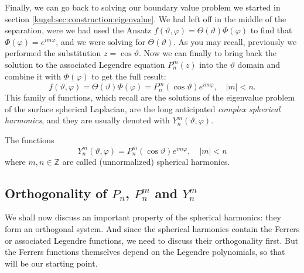 Finally, we can go back to solving our boundary value problem we started in
section \ref{kugel:sec:construction:eigenvalue}. We had left off in the middle
of the separation, were we had used the Ansatz $f(\vartheta, \varphi) =
\Theta(\vartheta) \Phi(\varphi)$ to find that $\Phi(\varphi) = e^{im\varphi}$,
and we were solving for $\Theta(\vartheta)$.  As you may recall, previously we
performed the substitution $z = \cos \vartheta$. Now we can finally to bring back the
solution to the associated Legendre equation $P^m_n(z)$ into the $\vartheta$
domain and combine it with $\Phi(\varphi)$ to get the full result:
\begin{equation*}
    f(\vartheta, \varphi)
      = \Theta(\vartheta)\Phi(\varphi)
      = P^m_n (\cos \vartheta) e^{im\varphi}, \quad |m|<n.
\end{equation*}
This family of functions, which recall are the solutions of the eigenvalue
problem of the surface spherical Laplacian, are the long anticipated
\emph{complex spherical harmonics}, and they are usually denoted with
$Y^m_n(\vartheta, \varphi)$.

\begin{definition}
  \label{kugel:def:spherical-harmonics}
  The functions
  \begin{equation*}
    Y^m_n (\vartheta, \varphi) = P^m_n(\cos \vartheta) e^{im\varphi}, \quad |m|<n
  \end{equation*}
  where $m, n \in \mathbb{Z}$ are called (unnormalized) spherical
  harmonics.
\end{definition}

\begin{figure}
  \centering
  \kugelplaceholderfig{\textwidth}{.8\paperheight}
  \caption{
    \label{kugel:fig:spherical-harmonics}
  }
\end{figure}


\subsection{Orthogonality of $P_n$, $P^m_n$ and $Y^m_n$}

We shall now discuss an important property of the spherical harmonics: they form
an orthogonal system. And since the spherical harmonics contain the Ferrers or
associated Legendre functions, we need to discuss their orthogonality first.
But the Ferrers functions themselves depend on the Legendre polynomials, so that
will be our starting point.

